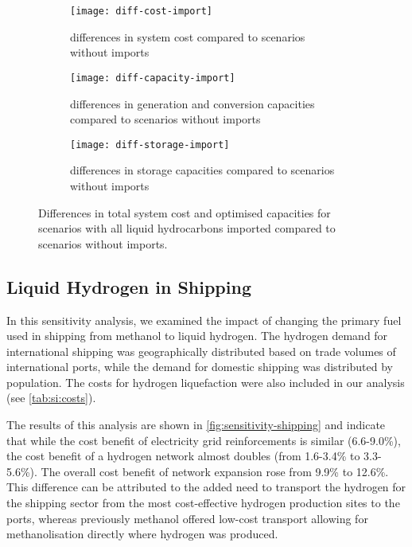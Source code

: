 \begin{figure}
    \centering
    \begin{subfigure}[t]{\textwidth}
        \centering
        \caption{differences in system cost compared to scenarios without imports}
        \texttt{[image: diff-cost-import]}
        \label{fig:sensitivity-import-cost}
    \end{subfigure}
    \begin{subfigure}[t]{\textwidth}
        \centering
        \caption{differences in generation and conversion capacities compared to scenarios without imports}
        \texttt{[image: diff-capacity-import]}
        \label{fig:sensitivity-import-cap}
    \end{subfigure}
    \begin{subfigure}[t]{\textwidth}
        \centering
        \caption{differences in storage capacities compared to scenarios without imports}
        \texttt{[image: diff-storage-import]}
        \label{fig:sensitivity-import-sto}
    \end{subfigure}
    \caption{Differences in total system cost and optimised capacities for scenarios with all liquid hydrocarbons imported compared to scenarios without imports.}
    \label{fig:sensitivity-import-diff}
\end{figure}


\subsection{Liquid Hydrogen in Shipping}
\label{sec:si:sensitivity-shipping}

In this sensitivity analysis, we examined the impact of changing the primary
fuel used in shipping from methanol to liquid hydrogen. The hydrogen demand for
international shipping was geographically distributed based on trade volumes of
international ports, while the demand for domestic
shipping was distributed by population. The costs for hydrogen liquefaction were
also included in our analysis (see \cref{tab:si:costs}).

The results of this analysis are shown in \cref{fig:sensitivity-shipping} and
indicate that while the cost benefit of electricity grid reinforcements is
similar (6.6-9.0\%), the cost benefit of a hydrogen network almost doubles (from
1.6-3.4\% to 3.3-5.6\%). The overall cost benefit of network expansion rose from
9.9\% to 12.6\%. This difference can be attributed to the added need to
transport the hydrogen for the shipping sector from the most cost-effective
hydrogen production sites to the ports, whereas previously methanol offered
low-cost transport allowing for methanolisation directly where hydrogen was
produced.


